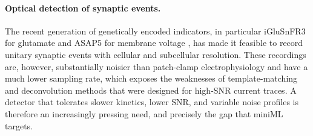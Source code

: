 \paragraph{Optical detection of synaptic events.}
The recent generation of genetically encoded indicators, in particular iGluSnFR3 for glutamate \citep{aggarwal2023iglusnfr3} and ASAP5 for membrane voltage \citep{hao2024asap5}, has made it feasible to record unitary synaptic events with cellular and subcellular resolution. These recordings are, however, substantially noisier than patch-clamp electrophysiology and have a much lower sampling rate, which exposes the weaknesses of template-matching and deconvolution methods that were designed for high-SNR current traces. A detector that tolerates slower kinetics, lower SNR, and variable noise profiles is therefore an increasingly pressing need, and precisely the gap that miniML targets.
